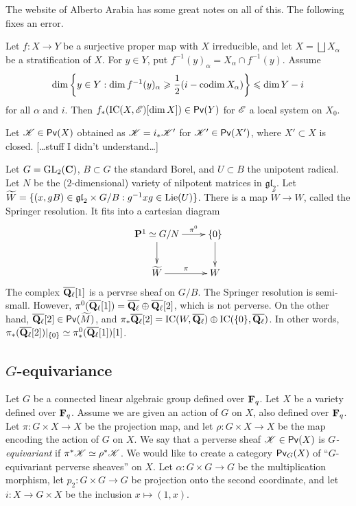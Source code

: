 \documentclass{article}
\begin{document}
The website of Alberto Arabia has some great notes on all of this. The 
following fixes an error. 

\begin{proposition}
Let $f:X\to Y$ be a surjective proper map with $X$ irreducible, and let 
$X=\bigsqcup X_\alpha$ be a stratification of $X$. For 
$y\in Y$, put $f^{-1}(y)_\alpha = X_\alpha\cap f^{-1}(y)$. Assume 
\[
  \dim\left\{y\in Y:\dim f^{-1}(y)_\alpha \geqslant \frac 1 2 (i-\operatorname{codim} X_\alpha)\right\} \leqslant \dim Y-i 
\]
for all $\alpha$ and $i$. Then 
$f_\ast(\operatorname{IC}(X,\mathscr{E})[\dim X])\in \operatorname{\mathsf{Pv}}(Y)$ for 
$\mathscr{E}$ a local system on $X_0$. 
\end{proposition}

Let $\mathscr{K}\in \operatorname{\mathsf{Pv}}(X)$ obtained as $\mathscr{K}=i_\ast \mathscr{K}'$ for 
$\mathscr{K}'\in \operatorname{\mathsf{Pv}}(X')$, where $X'\subset X$ is closed. [\ldots stuff 
I didn't understand\ldots] 

\begin{example}
Let $G=\operatorname{GL}_2(\mathbf{C})$, $B\subset G$ the standard Borel, and 
$U\subset B$ the unipotent radical. Let $N$ be the ($2$-dimensional) variety of 
nilpotent matrices in $\mathfrak{gl}_2$. Let 
$\widetilde W = \{(x,g B)\in \mathfrak{gl}_2\times G/B:g^{-1} x g\in \operatorname{Lie}(U)\}$. 
There is a map $\widetilde W\to W$, called the Springer resolution. It fits into 
a cartesian diagram 
\[\xymatrix{
  \dP^1\simeq G/N \ar[r]^-{\pi^0} \ar[d] 
    & \{0\} \ar[d] \\
  \widetilde W \ar[r]^\pi 
    & W
}\]
The complex $\overline{\mathbf{Q}_\ell}[1]$ is a pervrse sheaf on $G/B$. The Springer 
resolution is semi-small. However, 
$\pi^0(\overline{\mathbf{Q}_\ell}[1]) = \overline{\mathbf{Q}_\ell}\oplus \overline{\mathbf{Q}_\ell}[2]$, 
which is not perverse. On the other hand, 
$\overline{\mathbf{Q}_\ell}[2]\in \operatorname{\mathsf{Pv}}(\widetilde M)$, and 
$\pi_\ast \overline{\mathbf{Q}_\ell}[2] = \operatorname{IC}(W,\overline{\mathbf{Q}_\ell}) \oplus \operatorname{IC}(\{0\},\overline{\mathbf{Q}_\ell})$. 
In other words, 
$\pi_\ast(\overline{\mathbf{Q}_\ell}[2])|_{\{0\}} \simeq \pi_\ast^0(\overline{\mathbf{Q}_\ell}[1])[1]$. 
\end{example}





\subsection{\texorpdfstring{$G$}{G}-equivariance}

Let $G$ be a connected linear algebraic group defined over $\mathbf{F}_q$. Let $X$ be a 
variety defined over $\mathbf{F}_q$. Assume we are given an action of $G$ on $X$, also 
defined over $\mathbf{F}_q$. Let $\pi:G\times X\to X$ be the projection map, and let 
$\rho:G\times X\to X$ be the map encoding the action of $G$ on $X$. We say that 
a perverse sheaf $\mathscr{K}\in \operatorname{\mathsf{Pv}}(X)$ is \emph{$G$-equivariant} if 
$\pi^\ast \mathscr{K}\simeq \rho^\ast \mathscr{K}$. We would like to create a category 
$\operatorname{\mathsf{Pv}}_G(X)$ of ``$G$-equivariant perverse sheaves'' on $X$. Let 
$\alpha:G\times G\to G$ be the multiplication morphism, let 
$p_2:G\times G\to G$ be projection onto the second coordinate, and let 
$i:X\to G\times X$ be the inclusion $x\mapsto (1,x)$.  
\end{document}
